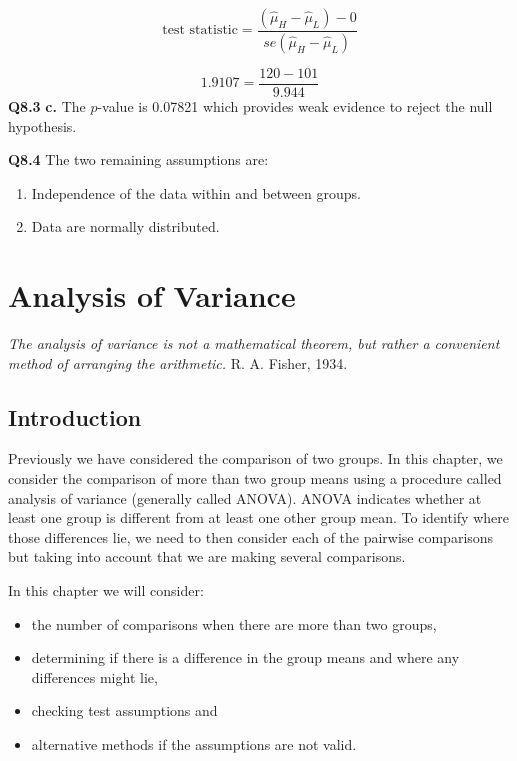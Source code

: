 \documentclass[
  oneside]{krantz}
\providecommand{\tightlist}{%
  \setlength{\itemsep}{0pt}\setlength{\parskip}{0pt}}
\begin{document}
\[\textrm{test statistic} = \frac{(\hat \mu_H - \hat \mu_L) - 0}{se(\hat \mu_H - \hat \mu_L)}\]

\[ 1.9107 =\frac{120 - 101}{9.944} \]
\textbf{Q8.3} \textbf{c.} The \(p\)-value is 0.07821 which provides weak evidence to reject the null hypothesis.

\textbf{Q8.4} The two remaining assumptions are:

\begin{enumerate}
\def\labelenumi{\arabic{enumi}.}
\item
  Independence of the data within and between groups.
\item
  Data are normally distributed.
\end{enumerate}

\hypertarget{anova}{%
\chapter{Analysis of Variance}\label{anova}}

\emph{The analysis of variance is not a mathematical theorem, but rather a convenient method of arranging the arithmetic.} R. A. Fisher, 1934.

\hypertarget{INTanova}{%
\section{Introduction}\label{INTanova}}

Previously we have considered the comparison of two groups. In this chapter, we consider the comparison of more than two group means using a procedure called analysis of variance (generally called ANOVA). ANOVA indicates whether at least one group is different from at least one other group mean. To identify where those differences lie, we need to then consider each of the pairwise comparisons but taking into account that we are making several comparisons.

In this chapter we will consider:

\begin{itemize}
\tightlist
\item
  the number of comparisons when there are more than two groups,
\item
  determining if there is a difference in the group means and where any differences might lie,
\item
  checking test assumptions and
\item
  alternative methods if the assumptions are not valid.
\end{itemize}
\end{document}
